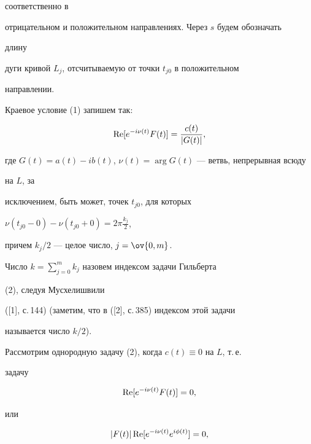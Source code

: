 соответственно в 


отрицательном и положительном направлениях. Через $s$ будем обозначать 


длину 


дуги кривой $L_j$, отсчитываемую от точки $t_{j0}$ в положительном 


направлении. 


 


Краевое условие (1) запишем так:


\begin{equation} 


\re[e^{-i\nu(t)}F(t)]= 


\frac{c(t)}{|G(t)|}, 


\end{equation} 


где $G(t)=a(t)-ib(t)$, $\nu(t)=\arg G(t)$ --- ветвь, непрерывная всюду 


на $L$, за 


исключением, быть может, точек $t_{j0}$, для которых 


$\nu(t_{j0}-0)-\nu(t_{j0}+0)=2\pi\frac{k_j}{2}$, 


причем $k_j/2$ --- целое число, $j=\ov{0,m}$. 


 


Число $k=\sum\limits^m_{j=0}k_j$ назовем индексом задачи Гильберта 


(2), следуя Мусхелишвили 


([1], с.\,144) (заметим, что в ([2], с.\,385) индексом этой задачи 


называется число $k/2$). 


 


Рассмотрим однородную задачу (2), когда $c(t)\equiv0$ на $L$, т.\,е. 


задачу 


\begin{equation} 


\re[e^{-i\nu(t)}F(t)]=0, 


\end{equation} 


или 


\begin{equation} 


|F(t)|\re[e^{-i\nu(t)}e^{i\phi(t)}]=0, 


\end{equation} 


